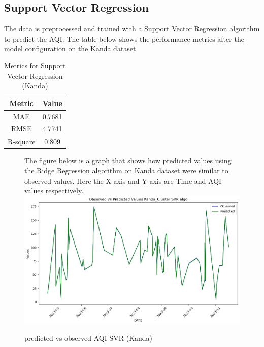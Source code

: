 \documentclass{book}
\numberwithin{equation}{section}
\numberwithin{figure}{section}
\begin{document}
\subsection{Support Vector Regression}
The data is preprocessed and trained with a Support Vector Regression algorithm to predict the AQI. The table below shows the performance metrics after the model configuration on the Kanda dataset.\\
\begin{table}[H]
    \centering
    \begin{tabular}{|c|c|}
        \hline
        \textbf{Metric} & \textbf{Value} \\
        \hline
        MAE & 0.7681 \\
        \hline
        RMSE & 4.7741 \\
        \hline
        R-square & 0.809 \\
        \hline
    \end{tabular}
    \caption{Metrics for Support Vector Regression (Kanda) }
    \label{tab: SVR metrics(Kanda)}
\end{table}
\begin{figure}[H]
 \begin{minipage}{\linewidth}
        The figure below is a graph that shows how predicted values using the Ridge Regression algorithm on Kanda dataset were similar to observed values. Here the X-axis and Y-axis are Time and AQI values respectively.
        \vspace{0.5em} 
        \includegraphics[width=\linewidth]{kand svr.png}
       
        \caption{ predicted vs observed AQI SVR (Kanda)}
        \label{fig: SVR predicted vs observed AQI(Kanda)}
    \end{minipage}
\end{figure}
\end{document}
